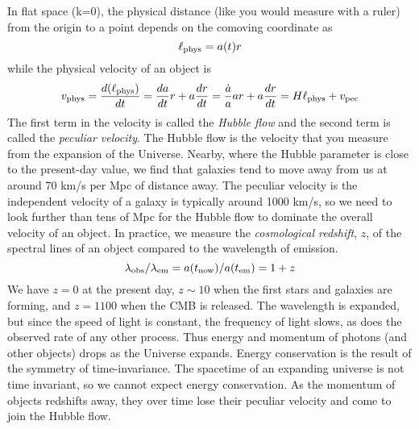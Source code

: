 In flat space (k=0), the physical distance (like you would measure with a ruler) from the origin to a point depends on the comoving coordinate as
\begin{equation}   
  \ell_{\rm phys} = a(t) r 
\end{equation}
while the physical velocity of an object is
\begin{equation}
  v_{\rm phys} = \frac{d(\ell_{\rm phys})}{dt} = \frac{da}{dt} r + a \frac{dr}{dt} = \frac{\dot a}{a} a r + a \frac{dr}{dt} = H \ell_{\rm phys} + v_{\rm pec}
\end{equation}
The first term in the velocity is called the \textit{Hubble flow} and the second term is called the \textit{peculiar velocity}.  The Hubble flow is the velocity that you measure from the expansion of the Universe.  Nearby, where the Hubble parameter is close to the present-day value, we find that galaxies tend to move away from us at around 70 km/s per Mpc of distance away.  The peculiar velocity is the independent velocity of a galaxy is typically around 1000 km/s, so we need to look further than tens of Mpc for the Hubble flow to dominate the overall velocity of an object.  In practice, we measure the \textit{cosmological redshift}, $z$, of the spectral lines of an object compared to the wavelength of emission.
\begin{equation} 
  \lambda_{\rm obs}/\lambda_{\rm em} = a(t_{\rm now}) / a(t_{\rm em}) = 1+z
\end{equation}
We have $z=0$ at the present day, $z \sim 10$ when the first stars and galaxies are forming, and $z =1100$ when the CMB is released.  The wavelength is expanded, but since the speed of light is constant, the frequency of light slows, as does the observed rate of any other process.  Thus energy and momentum of photons (and other objects) drops as the Universe expands.  Energy conservation is the result of the symmetry of time-invariance.  The spacetime of an expanding universe is not time invariant, so we cannot expect energy conservation.  As the momentum of objects redshifts away, they over time lose their peculiar velocity and come to join the Hubble flow.


